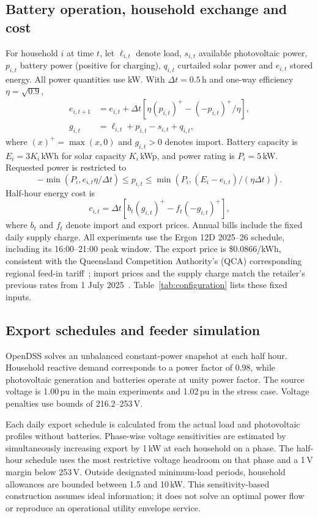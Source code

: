 \documentclass[preprint,12pt,a4paper]{elsarticle}
\begin{document}
\subsection{Battery operation, household exchange and cost}
For household $i$ at time $t$, let $\ell_{i,t}$ denote load, $s_{i,t}$ available photovoltaic power, $p_{i,t}$ battery power (positive for charging), $q_{i,t}$ curtailed solar power and $e_{i,t}$ stored energy. All power quantities use kW. With $\Delta t=0.5$\,h and one-way efficiency $\eta=\sqrt{0.9}$,
\begin{align}
e_{i,t+1}&=e_{i,t}+\Delta t\left[\eta(p_{i,t})^+-(-p_{i,t})^+/\eta\right],\\
g_{i,t}&=\ell_{i,t}+p_{i,t}-s_{i,t}+q_{i,t},
\end{align}
where $(x)^+=\max(x,0)$ and $g_{i,t}>0$ denotes import. Battery capacity is $E_i=3K_i$\,kWh for solar capacity $K_i$\,kWp, and power rating is $P_i=5$\,kW. Requested power is restricted to
\begin{equation}
-\min(P_i,e_{i,t}\eta/\Delta t)\leq p_{i,t}\leq
\min(P_i,(E_i-e_{i,t})/(\eta\Delta t)).
\end{equation}
Half-hour energy cost is
\begin{equation}
c_{i,t}=\Delta t\left[b_t(g_{i,t})^+-f_t(-g_{i,t})^+\right],
\end{equation}
where $b_t$ and $f_t$ denote import and export prices. Annual bills include the fixed daily supply charge. All experiments use the Ergon 12D 2025--26 schedule, including its 16:00--21:00 peak window. The export price is \$0.0866/kWh, consistent with the Queensland Competition Authority's (QCA) corresponding regional feed-in tariff~\cite{qca}; import prices and the supply charge match the retailer's previous rates from 1 July 2025~\cite{ergontariff}. Table~\ref{tab:configuration} lists these fixed inputs.

\subsection{Export schedules and feeder simulation}
OpenDSS solves an unbalanced constant-power snapshot at each half hour. Household reactive demand corresponds to a power factor of 0.98, while photovoltaic generation and batteries operate at unity power factor. The source voltage is 1.00\,pu in the main experiments and 1.02\,pu in the stress case. Voltage penalties use bounds of 216.2--253\,V.

Each daily export schedule is calculated from the actual load and photovoltaic profiles without batteries. Phase-wise voltage sensitivities are estimated by simultaneously increasing export by 1\,kW at each household on a phase. The half-hour schedule uses the most restrictive voltage headroom on that phase and a 1\,V margin below 253\,V. Outside designated minimum-load periods, household allowances are bounded between 1.5 and 10\,kW. This sensitivity-based construction assumes ideal information; it does not solve an optimal power flow or reproduce an operational utility envelope service.
\end{document}
